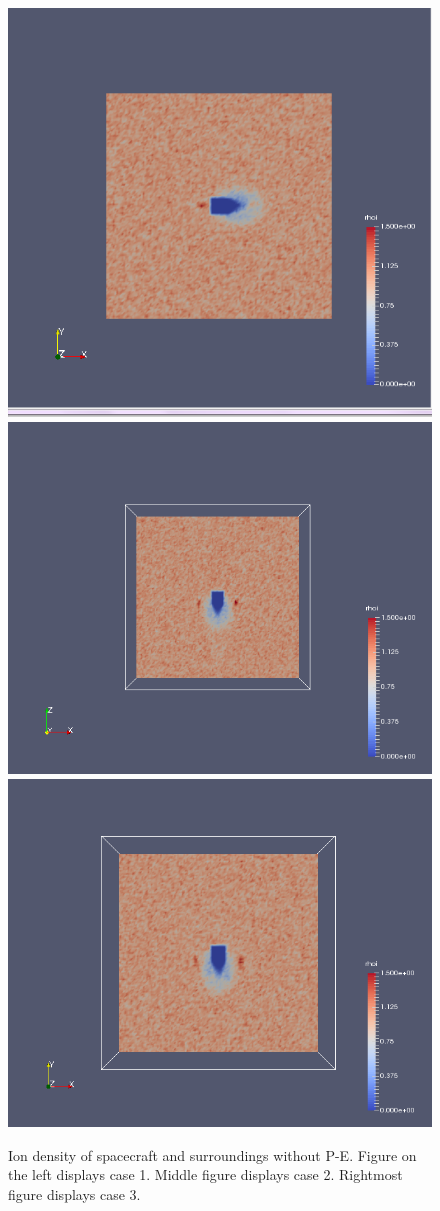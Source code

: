    \begin{figure}
        \includegraphics[width = 0.3 \textwidth]{images/ion_density_case1}
        \includegraphics[width = 0.3 \textwidth]{images/ion_density_x-z_case2}
	\includegraphics[width = 0.3 \textwidth]{images/ion_density_x-y_case3}
        \caption{Ion density of spacecraft and surroundings without P-E. Figure on the left displays case 1. Middle figure displays case 2. Rightmost figure displays case 3.}
		\label{fig:wake}
    \end{figure}
